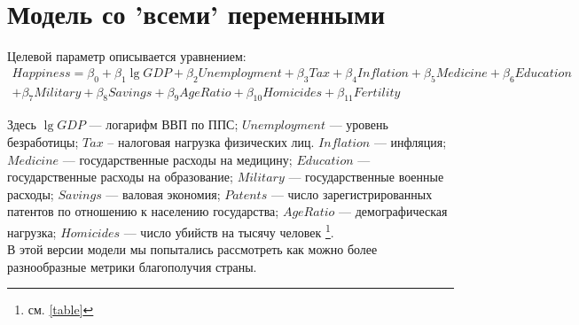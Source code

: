 \documentclass[russian]{vegareport}
\begin{document}
        \section{Модель со 'всеми' переменными}
        Целевой параметр описывается уравнением:
        \begin{align*}
        Happiness = \beta_0 + \beta_1 \lg{GDP} + \beta_2 Unemployment + \beta_3 Tax + \beta_4 Inflation + \beta_5 Medicine + \beta_6 Education \\
            + \beta_7 Military + \beta_8 Savings + \beta_{9} AgeRatio + \beta_{10} Homicides + \beta_{11} Fertility
        \end{align*}

        Здесь $\lg{GDP}$ --- логарифм ВВП по ППС; $Unemployment$ --- уровень безработицы; $Tax$ -- налоговая нагрузка физических лиц. $Inflation$ --- инфляция; $Medicine$ --- государственные расходы на медицину; $Education$ --- государственные расходы на образование; $Military$ --- государственные военные расходы; $Savings$ --- валовая экономия; $Patents$ --- число зарегистрированных патентов по отношению к населению государства; $AgeRatio$ --- демографическая нагрузка; $Homicides$ --- число убийств на тысячу человек \footnote{см. \ref{table}}.
        \\
        В этой версии модели мы попытались рассмотреть как можно более разнообразные метрики благополучия страны.
    
    
\end{document}
